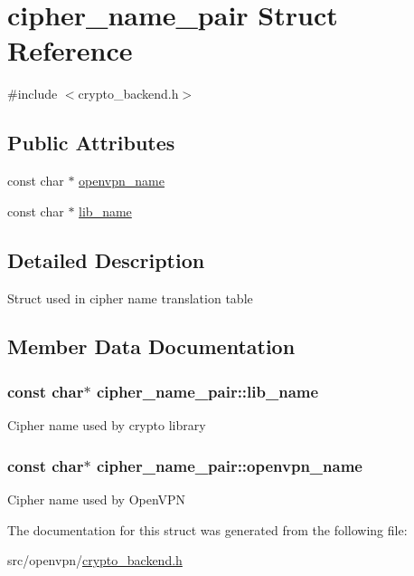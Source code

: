 \hypertarget{structcipher__name__pair}{}\section{cipher\+\_\+name\+\_\+pair Struct Reference}
\label{structcipher__name__pair}


{\ttfamily \#include $<$crypto\+\_\+backend.\+h$>$}

\subsection*{Public Attributes}
\begin{DoxyCompactItemize}
\item 
const char $\ast$ \hyperlink{structcipher__name__pair_a8721e2007ddeeca3621a32bdcb91f8f7}{openvpn\+\_\+name}
\item 
const char $\ast$ \hyperlink{structcipher__name__pair_add13a313f39ebde98a65afde6e8de35d}{lib\+\_\+name}
\end{DoxyCompactItemize}


\subsection{Detailed Description}
Struct used in cipher name translation table 

\subsection{Member Data Documentation}
\hypertarget{structcipher__name__pair_add13a313f39ebde98a65afde6e8de35d}{}
\subsubsection[{lib\+\_\+name}]{\setlength{\rightskip}{0pt plus 5cm}const char$\ast$ cipher\+\_\+name\+\_\+pair\+::lib\+\_\+name}\label{structcipher__name__pair_add13a313f39ebde98a65afde6e8de35d}
Cipher name used by crypto library \hypertarget{structcipher__name__pair_a8721e2007ddeeca3621a32bdcb91f8f7}{}
\subsubsection[{openvpn\+\_\+name}]{\setlength{\rightskip}{0pt plus 5cm}const char$\ast$ cipher\+\_\+name\+\_\+pair\+::openvpn\+\_\+name}\label{structcipher__name__pair_a8721e2007ddeeca3621a32bdcb91f8f7}
Cipher name used by Open\+V\+P\+N 

The documentation for this struct was generated from the following file\+:\begin{DoxyCompactItemize}
\item 
src/openvpn/\hyperlink{crypto__backend_8h}{crypto\+\_\+backend.\+h}\end{DoxyCompactItemize}
